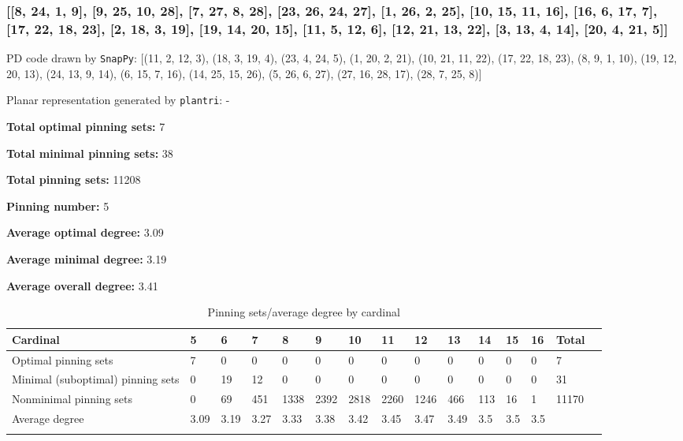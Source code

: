 \documentclass{article}%
\begin{document}
\newpage

\subsubsection{[[8, 24, 1, 9], [9, 25, 10, 28], [7, 27, 8, 28], [23, 26, 24, 27], [1, 26, 2, 25], [10, 15, 11, 16], [16, 6, 17, 7], [17, 22, 18, 23], [2, 18, 3, 19], [19, 14, 20, 15], [11, 5, 12, 6], [12, 21, 13, 22], [3, 13, 4, 14], [20, 4, 21, 5]]}

{\small\noindent PD code drawn by \texttt{SnapPy}: [(11, 2, 12, 3), (18, 3, 19, 4), (23, 4, 24, 5), (1, 20, 2, 21), (10, 21, 11, 22), (17, 22, 18, 23), (8, 9, 1, 10), (19, 12, 20, 13), (24, 13, 9, 14), (6, 15, 7, 16), (14, 25, 15, 26), (5, 26, 6, 27), (27, 16, 28, 17), (28, 7, 25, 8)]}

{\small\noindent Planar representation generated by \texttt{plantri}: -}

\begin{multicols}{2}
{\normalsize \noindent\textbf{Total optimal pinning sets:} 7

\noindent\textbf{Total minimal pinning sets:} 38

\noindent\textbf{Total pinning sets:} 11208

\noindent\textbf{Pinning number:} 5

}
\columnbreak

{\normalsize \noindent\textbf{Average optimal degree:} 3.09

\noindent\textbf{Average minimal degree:} 3.19

\noindent\textbf{Average overall degree:} 3.41

}
\end{multicols}

\begin{table}[ht]
	\caption{Pinning sets/average degree by cardinal}
	\centering
	\renewcommand{\arraystretch}{1.5}
	\begin{tabularx}{\textwidth}{lXXXXXXXXXXXXXX}
		\toprule
			Cardinal & 5 & 6 & 7 & 8 & 9 & 10 & 11 & 12 & 13 & 14 & 15 & 16 & Total\\
			\hline
			Optimal pinning sets & 7 & 0 & 0 & 0 & 0 & 0 & 0 & 0 & 0 & 0 & 0 & 0 & 7 \\
			Minimal (suboptimal) pinning sets & 0 & 19 & 12 & 0 & 0 & 0 & 0 & 0 & 0 & 0 & 0 & 0 & 31 \\
			Nonminimal pinning sets & 0 & 69 & 451 & 1338 & 2392 & 2818 & 2260 & 1246 & 466 & 113 & 16 & 1 & 11170 \\
			Average degree & 3.09 & 3.19 & 3.27 & 3.33 & 3.38 & 3.42 & 3.45 & 3.47 & 3.49 & 3.5 & 3.5 & 3.5 &  \\
		\bottomrule \\ 
	\end{tabularx}
\end{table}
\end{document}
